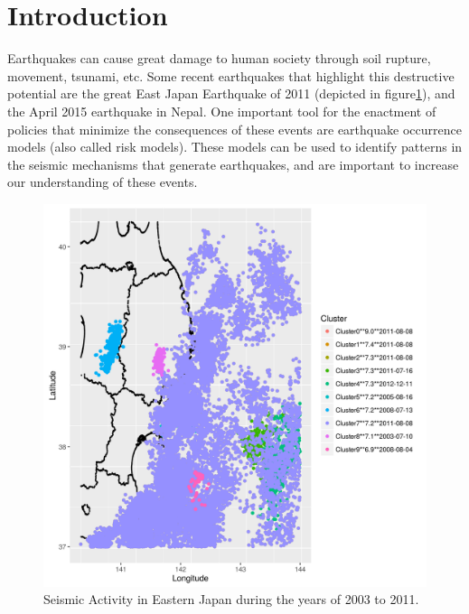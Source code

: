 
\section{Introduction}\label{intro}




Earthquakes can cause great damage to human society through soil
rupture, movement, tsunami, etc. Some recent earthquakes that
highlight this destructive potential are the great East Japan
Earthquake of 2011 (depicted in figure\ref{GreatEastJapan}), and the
April 2015 earthquake in Nepal. One important tool for the enactment
of policies that minimize the consequences of these events are
earthquake occurrence models (also called risk models). These models
can be used to identify patterns in the seismic mechanisms that
generate earthquakes, and are important to increase our understanding
of these events.



\begin{figure}[]
	\centering
	\includegraphics[width=.55\textwidth]{img/slc_leste.png}
	\caption{Seismic Activity in Eastern Japan during the years of 2003 to 2011.}
	\label{GreatEastJapan}
\end{figure}

